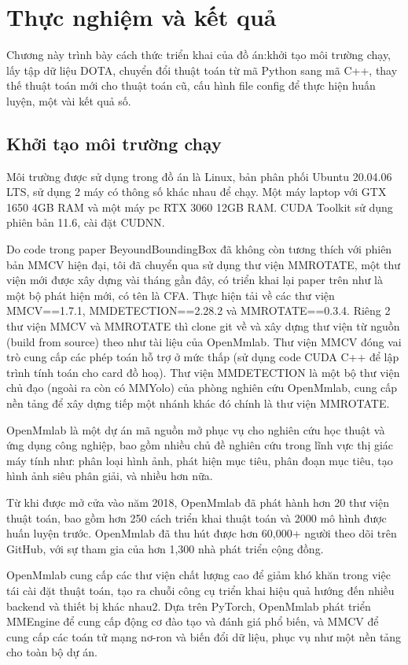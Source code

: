\documentclass[12pt,a4paper,openany,oneside]{report}
\begin{document}
\chapter{Thực nghiệm và kết quả}

Chương này trình bày cách thức triển khai của đồ án:khởi tạo môi trường chạy, lấy tập dữ liệu DOTA, chuyển đổi thuật toán từ mã Python sang mã C++, thay thế thuật toán mới cho thuật toán cũ, cấu hình file config để thực hiện huấn luyện, một vài kết quả số.
\section{Khởi tạo môi trường chạy} 

Môi trường được sử dụng trong đồ án là Linux, bản phân phối Ubuntu 20.04.06 LTS, sử dụng 2 máy có thông số khác nhau để chạy. Một máy laptop với GTX 1650 4GB RAM và một máy pc RTX 3060 12GB RAM. CUDA Toolkit sử dụng phiên bản 11.6, cài đặt CUDNN.

Do code trong paper BeyoundBoundingBox đã không còn tương thích với phiên bản MMCV \cite{MMCV} hiện đại, tôi đã chuyển qua sử dụng thư viện MMROTATE, một thư viện mới được xây dựng vài tháng gần đây, có triển khai lại paper trên như là một bộ phát hiện mới, có tên là CFA. Thực hiện tải về các thư viện MMCV==1.7.1, MMDETECTION==2.28.2 và MMROTATE==0.3.4. Riêng 2 thư viện MMCV và MMROTATE \cite{MMRotate} thì clone git về và xây dựng thư viện từ nguồn (build from source) theo như tài liệu của OpenMmlab. Thư viện MMCV đóng vai trò cung cấp các phép toán hỗ trợ ở mức thấp (sử dụng code CUDA C++ để lập trình tính toán cho card đồ hoạ). Thư viện MMDETECTION \cite{MMDetection} là một bộ thư viện chủ đạo (ngoài ra còn có MMYolo) của phòng nghiên cứu OpenMmlab, cung cấp nền tảng để xây dựng tiếp một nhánh khác đó chính là thư viện MMROTATE. 

OpenMmlab là một dự án mã nguồn mở phục vụ cho nghiên cứu học thuật và ứng dụng công nghiệp, bao gồm nhiều chủ đề nghiên cứu trong lĩnh vực thị giác máy tính như: phân loại hình ảnh, phát hiện mục tiêu, phân đoạn mục tiêu, tạo hình ảnh siêu phân giải, và nhiều hơn nữa.

Từ khi được mở cửa vào năm 2018, OpenMmlab đã phát hành hơn 20 thư viện thuật toán, bao gồm hơn 250 cách triển khai thuật toán và 2000 mô hình được huấn luyện trước. OpenMmlab đã thu hút được hơn 60,000+ người theo dõi trên GitHub, với sự tham gia của hơn 1,300 nhà phát triển cộng đồng.

OpenMmlab cung cấp các thư viện chất lượng cao để giảm khó khăn trong việc tái cài đặt thuật toán, tạo ra chuỗi công cụ triển khai hiệu quả hướng đến nhiều backend và thiết bị khác nhau2. Dựa trên PyTorch, OpenMmlab phát triển MMEngine để cung cấp động cơ đào tạo và đánh giá phổ biến, và MMCV để cung cấp các toán tử mạng nơ-ron và biến đổi dữ liệu, phục vụ như một nền tảng cho toàn bộ dự án.
\end{document}
